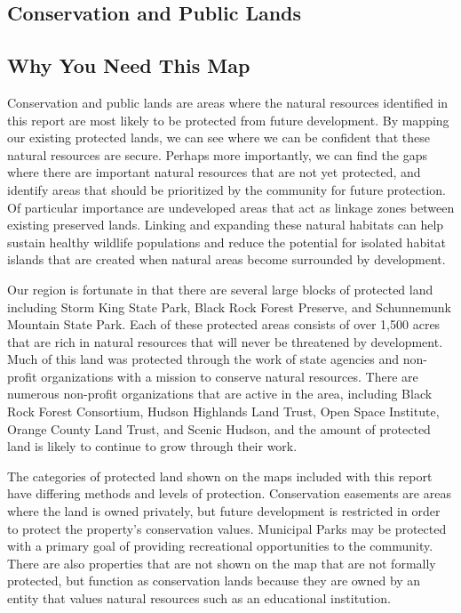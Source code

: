 \label{map:farmlandsoilsandagparcels}
\subsection{Conservation and Public Lands}\label{subsec:conservation}
\subsection*{Why You Need This Map}
Conservation and public lands are areas where the natural resources identified 
in this report are most likely to be protected from future development. By 
mapping our existing protected lands, we can see where we can be confident that 
these natural resources are secure. Perhaps more importantly, we can find the 
gaps where there are important natural resources that are not yet protected, 
and identify areas that should be prioritized by the community for future 
protection. Of particular importance are undeveloped areas that act as linkage 
zones between existing preserved lands. Linking and expanding these natural 
habitats can help sustain healthy wildlife populations and reduce the potential 
for isolated habitat islands that are created when natural areas become 
surrounded by development. 
\par
Our region is fortunate in that there are several large blocks of protected 
land including Storm King State Park, Black Rock Forest Preserve, and 
Schunnemunk Mountain State Park. Each of these protected areas consists of over 
1,500 acres that are rich in natural resources that will never be threatened by 
development. Much of this land was protected through the work of state agencies 
and non-profit organizations with a mission to conserve natural resources. There 
are numerous non-profit organizations that are active in the area, including 
Black Rock Forest Consortium, Hudson Highlands Land Trust, Open Space 
Institute, Orange County Land Trust, and Scenic Hudson, and the amount of 
protected land is likely to continue to grow through their work. 
\par
The categories of protected land shown on the maps included with this report 
have differing methods and levels of protection. Conservation easements are 
areas where the land is owned privately, but future development is restricted in 
order to protect the property’s conservation values. Municipal Parks may be 
protected with a primary goal of providing recreational opportunities to the 
community. There are also properties that are not shown on the map that are not 
formally protected, but function as conservation lands because they are owned by 
an entity that values natural resources such as an educational institution. 


